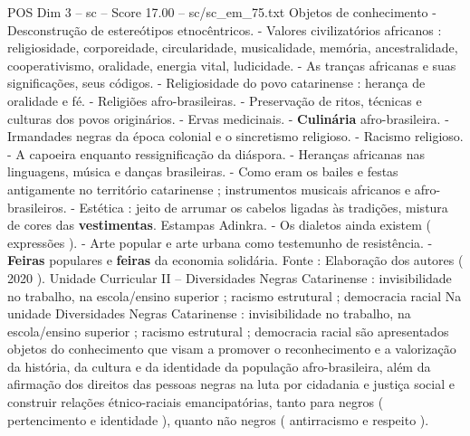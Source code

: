 \begin{textsample}{POS Dim 3 – sc – Score 17.00 – sc/sc\_em\_75.txt}
Objetos de conhecimento - Desconstrução de estereótipos etnocêntricos. - Valores civilizatórios africanos : religiosidade, corporeidade, circularidade, musicalidade, memória, ancestralidade, cooperativismo, oralidade, energia vital, ludicidade. - As tranças africanas e suas significações, seus códigos. - Religiosidade do povo catarinense : herança de oralidade e fé. - Religiões afro-brasileiras. - Preservação de ritos, técnicas e culturas dos povos originários. - Ervas medicinais. - \textbf{Culinária} afro-brasileira. - Irmandades negras da época colonial e o sincretismo religioso. - Racismo religioso. - A capoeira enquanto ressignificação da diáspora. - Heranças africanas nas linguagens, música e danças brasileiras. - Como eram os bailes e festas antigamente no território catarinense ; instrumentos musicais africanos e afro-brasileiros. - Estética : jeito de arrumar os cabelos ligadas às tradições, mistura de cores das \textbf{vestimentas}.
Estampas Adinkra. - Os dialetos ainda existem ( expressões ). - Arte popular e arte urbana como testemunho de resistência. - \textbf{Feiras} populares e \textbf{feiras} da economia solidária.
Fonte : Elaboração dos autores ( 2020 ).
Unidade Curricular II – Diversidades Negras Catarinense : invisibilidade no trabalho, na escola/ensino superior ; racismo estrutural ; democracia racial Na unidade Diversidades Negras Catarinense : invisibilidade no trabalho, na escola/ensino superior ; racismo estrutural ; democracia racial são apresentados objetos do conhecimento que visam a promover o reconhecimento e a valorização da história, da cultura e da identidade da população afro-brasileira, além da afirmação dos direitos das pessoas negras na luta por cidadania e justiça social e construir relações étnico-raciais emancipatórias, tanto para negros ( pertencimento e identidade ), quanto não negros ( antirracismo e respeito ).

\end{textsample}
